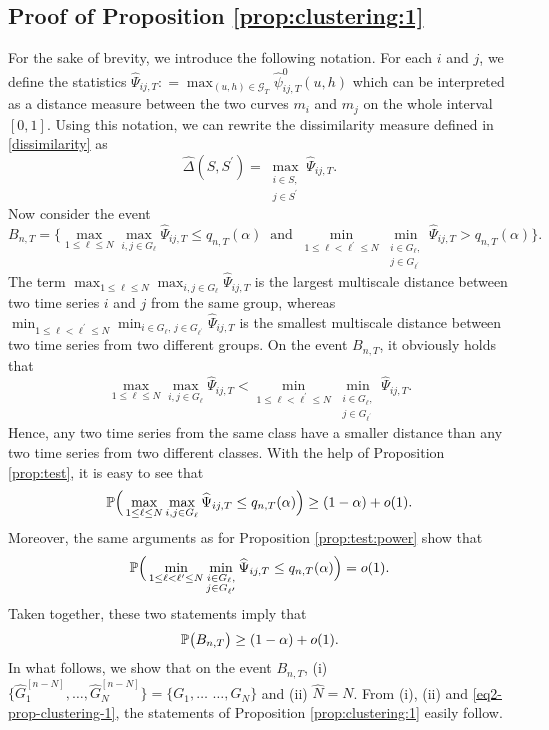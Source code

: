 \subsection*{Proof of Proposition \ref{prop:clustering:1}}

For the sake of brevity, we introduce the following notation. For each $i$ and $j$, we define the statistics $\widehat{\Psi}_{ij,T} : = \max_{(u, h) \in \mathcal{G}_T}\hat{\psi}^0_{ij, T}(u, h)$ which can be interpreted as a distance measure between the two curves $m_i$ and $m_j$ on the whole interval $[0, 1]$. Using this notation, we can rewrite the dissimilarity measure defined in \eqref{dissimilarity} as 
\begin{equation*}
\widehat{\Delta}(S,S^\prime) = \max_{\substack{i \in S, \\ j \in S^\prime}} \widehat{\Psi}_{ij,T}. 
\end{equation*}
Now consider the event  
\[ B_{n,T} = \Big\{ \max_{1 \le \ell \le N} \max_{i,j \in G_\ell} \widehat{\Psi}_{ij,T} \le q_{n,T}(\alpha) \ \text{ and } \ \min_{1 \le \ell < \ell^\prime \le N} \min_{\substack{i \in G_\ell, \\ j \in G_{\ell^\prime}}} \widehat{\Psi}_{ij,T} > q_{n,T}(\alpha) \Big\}. \]
The term $\max_{1 \le \ell \le N} \max_{i,j \in G_\ell} \widehat{\Psi}_{ij,T}$ is the largest multiscale distance between two time series $i$ and $j$ from the same group, whereas $\min_{1 \le \ell < \ell^\prime \le N} \min_{i \in G_\ell, \, j \in G_{\ell^\prime}} \widehat{\Psi}_{ij,T}$ is the smallest multiscale distance between two time series from two different groups. On the event $B_{n,T}$, it obviously holds that 
\begin{equation}\label{eq1-prop-clustering-1}
\max_{1 \le \ell \le N} \max_{i,j \in G_\ell} \widehat{\Psi}_{ij,T} < \min_{1 \le \ell < \ell^\prime \le N} \min_{\substack{i \in G_\ell, \\ j \in G_{\ell^\prime}}} \widehat{\Psi}_{ij,T}. 
\end{equation}
Hence, any two time series from the same class have a smaller distance than any two time series from two different classes. With the help of Proposition \ref{prop:test}, it is easy to see that
\[  \mathbb{P} \Big( \max_{1 \le \ell \le N} \max_{i,j \in G_\ell} \widehat{\Psi}_{ij,T} \le q_{n,T}(\alpha) \Big) \ge (1 - \alpha) + o(1). \]
Moreover, the same arguments as for Proposition \ref{prop:test:power} show that 
\[  \mathbb{P} \Big( \min_{1 \le \ell < \ell^\prime \le N} \min_{\substack{i \in G_\ell, \\ j \in G_{\ell^\prime}}} \widehat{\Psi}_{ij,T} \le q_{n,T}(\alpha) \Big) = o(1). \]
Taken together, these two statements imply that 
\begin{equation}\label{eq2-prop-clustering-1}
\mathbb{P} \big( B_{n,T} \big) \ge (1-\alpha) + o(1). 
\end{equation}
In what follows, we show that on the event $B_{n,T}$, (i) $\{ \widehat{G}_1^{[n-N]},\ldots,\widehat{G}_N^{[n-N]} \big\} = \big\{ G_1,\ldots$ $\ldots,G_N \}$ and (ii) $\widehat{N} = N$. From (i), (ii) and \eqref{eq2-prop-clustering-1}, the statements of Proposition \ref{prop:clustering:1} easily follow. 


